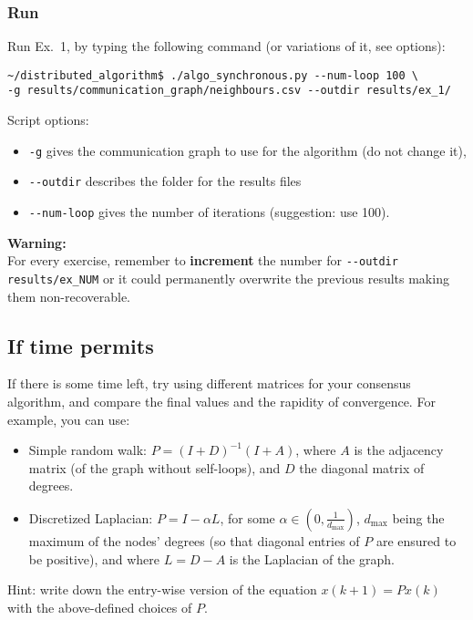\documentclass[oneside]{article}
\begin{document}
        
\subsubsection{Run} %
Run Ex.~1, by typing the following command (or variations of it, see options):

\begin{verbatim}
~/distributed_algorithm$ ./algo_synchronous.py --num-loop 100 \
-g results/communication_graph/neighbours.csv --outdir results/ex_1/
\end{verbatim}


Script options:
\begin{itemize}
	\item \verb=-g= gives the communication graph to use for the algorithm (do not change it),
	\item \verb=--outdir= describes the folder for the results files
    \item \verb=--num-loop=  gives the number of iterations (suggestion: use 100).
\end{itemize}

\textbf{Warning:} \\
For every exercise, remember to \textbf{increment} the number for \verb=--outdir results/ex_NUM=
or it could permanently overwrite the previous results making them non-recoverable.




\subsection{If time permits}
If there is some time left, try using different matrices for your consensus algorithm, and compare the final values and the rapidity of convergence. For example, you can use:
\begin{itemize}
\item Simple random walk: $P = (I+D)^{-1} (I+A)$, where $A$ is the adjacency matrix (of the graph without self-loops), and $D$ the diagonal matrix of degrees.
\item Discretized Laplacian:  $P = I - \alpha L$, for some $\alpha \in (0,\frac{1}{d_{\max}})$, $d_{\max}$ being the maximum of the nodes' degrees (so that diagonal entries of $P$ are ensured to be positive), and where $L=D-A$ is the Laplacian of the graph.
\end{itemize}
Hint: write down the entry-wise version of the equation $x(k+1) = P x(k)$ with the above-defined choices of $P$.
\end{document}
